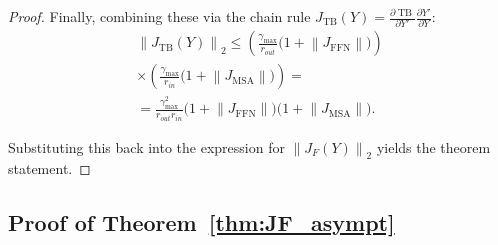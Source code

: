 \documentclass{zapiski}
\theoremstyle{plain}
\theoremstyle{definition}
\theoremstyle{remark}
\newcommand{\norm}[1]{\left\lVert #1 \right\rVert}
\DeclareMathOperator{\FFN}{FFN}
\DeclareMathOperator{\MSA}{MSA}
\DeclareMathOperator{\TB}{TB}
\begin{document}
\begin{proof}
Finally, combining these via the chain rule $J_{\TB}(Y) = \frac{\partial \TB}{\partial Y'} \frac{\partial Y'}{\partial Y}$:
\begin{multline}
\norm{J_{\TB}(Y)}_2 
\le \left( \frac{\gamma_{\max}}{r_{out}} 
       \big(1 + \norm{J_{\FFN}}\big) \right) \\
       \times \left( \frac{\gamma_{\max}}{r_{in}}
       \big(1 + \norm{J_{\MSA}}\big) \right) =\\
= \frac{\gamma_{\max}^2}{r_{out} r_{in}} 
   \big(1 + \norm{J_{\FFN}}\big) 
   \big(1 + \norm{J_{\MSA}}\big).
\end{multline}

Substituting this back into the expression for $\norm{J_F(Y)}_2$ yields the theorem statement.
\end{proof}

\subsection{Proof of Theorem~\ref{thm:JF_asympt}}
\label{app:JF_asympt}
\end{document}
